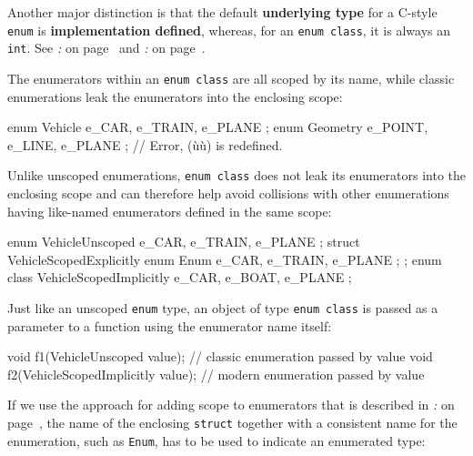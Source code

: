 \noindent Another major distinction is that the default
\textbf{underlying type} for a C-style \texttt{enum} is
\textbf{implementation defined}, whereas, for an
\texttt{enum}~\texttt{class}, it is always an \texttt{int}. See
\textit{: } on page~\pageref{enum-class-and-underlying-type} and
\textit{: } on page~\pageref{external-use-of-opaque-enumerators-enumclass}.

The enumerators within an \texttt{enum}~\texttt{class} are all scoped by
its name, while classic enumerations leak the enumerators into the
enclosing scope:

\begin{emcppslisting}
enum Vehicle  { e_CAR,   e_TRAIN, e_PLANE };
enum Geometry { e_POINT, e_LINE,  e_PLANE };  // Error, (ù{}ù) is redefined.
\end{emcppslisting}

\noindent Unlike unscoped enumerations, \texttt{enum}~\texttt{class} does not leak
its enumerators into the enclosing scope and can therefore help avoid
collisions with other enumerations having like-named enumerators defined
in the same scope:

\begin{emcppslisting}[emcppsbatch=e3]
enum       VehicleUnscoped  { e_CAR, e_TRAIN, e_PLANE };
struct     VehicleScopedExplicitly { enum Enum { e_CAR, e_TRAIN, e_PLANE }; };
enum class VehicleScopedImplicitly { e_CAR, e_BOAT,  e_PLANE };
\end{emcppslisting}

\noindent Just like an unscoped \texttt{enum} type, an object of type
\texttt{enum}~\texttt{class} is passed as a parameter to a function
using the enumerator name itself:

\begin{emcppslisting}[emcppsbatch=e3]
void f1(VehicleUnscoped value);          // classic enumeration passed by value
void f2(VehicleScopedImplicitly value);  // modern enumeration passed by value
\end{emcppslisting}

If we use the approach for
adding scope to enumerators that is described in \textit{: } on page~\pageref{drawbacks-relating-to-weakly-typed,-c++03-enumerators}, the name of the enclosing \texttt{struct} together with a
consistent name for the enumeration, such as \texttt{Enum}, has to be used to indicate an
enumerated type:

